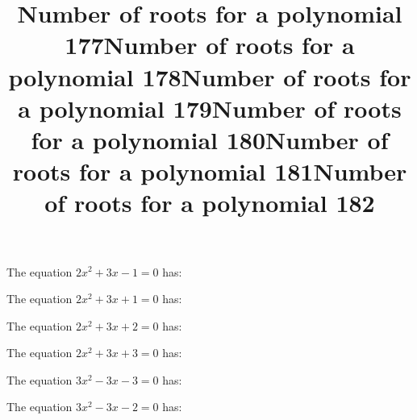 \documentclass{article}
\begin{document}
\begin{category}
\begin{question}[multichoice]


\end{question}
\begin{question}[multichoice]
\title{Number of roots for a polynomial 177}
The equation $2 x^{2} + 3 x - 1=0$ has:



\end{question}
\begin{question}[multichoice]
\title{Number of roots for a polynomial 178}
The equation $2 x^{2} + 3 x + 1=0$ has:



\end{question}
\begin{question}[multichoice]
\title{Number of roots for a polynomial 179}
The equation $2 x^{2} + 3 x + 2=0$ has:



\end{question}
\begin{question}[multichoice]
\title{Number of roots for a polynomial 180}
The equation $2 x^{2} + 3 x + 3=0$ has:



\end{question}
\begin{question}[multichoice]
\title{Number of roots for a polynomial 181}
The equation $3 x^{2} - 3 x - 3=0$ has:



\end{question}
\begin{question}[multichoice]
\title{Number of roots for a polynomial 182}
The equation $3 x^{2} - 3 x - 2=0$ has:




\end{question}
\end{category}
\end{document}
